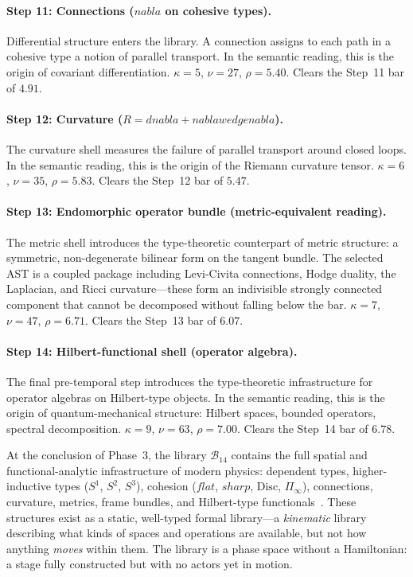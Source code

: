 \documentclass[11pt,a4paper]{article}
\def\nabla{nabla}%
\def\wedge{wedge}%
\def\flat{flat}%
\def\sharp{sharp}%
\theoremstyle{plain}
\theoremstyle{definition}
\theoremstyle{remark}
\newcommand{\Disc}{\mathrm{Disc}}
\newcommand{\B}{\mathcal{B}}
\begin{document}
\paragraph{Step 11: Connections ($\nabla$ on cohesive types).}  Differential structure enters the library.  A connection assigns to each path in a cohesive type a notion of parallel transport.  In the semantic reading, this is the origin of covariant differentiation.  $\kappa = 5$, $\nu = 27$, $\rho = 5.40$.  Clears the Step~11 bar of $4.91$.

\paragraph{Step 12: Curvature ($R = d\nabla + \nabla \wedge \nabla$).}  The curvature shell measures the failure of parallel transport around closed loops.  In the semantic reading, this is the origin of the Riemann curvature tensor.  $\kappa = 6$, $\nu = 35$, $\rho = 5.83$.  Clears the Step~12 bar of $5.47$.

\paragraph{Step 13: Endomorphic operator bundle (metric-equivalent reading).}  The metric shell introduces the type-theoretic counterpart of metric structure: a symmetric, non-degenerate bilinear form on the tangent bundle.  The selected AST is a coupled package including Levi-Civita connections, Hodge duality, the Laplacian, and Ricci curvature---these form an indivisible strongly connected component that cannot be decomposed without falling below the bar.  $\kappa = 7$, $\nu = 47$, $\rho = 6.71$.  Clears the Step~13 bar of $6.07$.

\paragraph{Step 14: Hilbert-functional shell (operator algebra).}  The final pre-temporal step introduces the type-theoretic infrastructure for operator algebras on Hilbert-type objects.  In the semantic reading, this is the origin of quantum-mechanical structure: Hilbert spaces, bounded operators, spectral decomposition.  $\kappa = 9$, $\nu = 63$, $\rho = 7.00$.  Clears the Step~14 bar of $6.78$.

At the conclusion of Phase~3, the library $\B_{14}$ contains the full spatial and functional-analytic infrastructure of modern physics: dependent types, higher-inductive types ($S^1$, $S^2$, $S^3$), cohesion ($\flat$, $\sharp$, $\Disc$, $\Pi_{\!\infty}$), connections, curvature, metrics, frame bundles, and Hilbert-type functionals~\cite{pen2026}.  These structures exist as a static, well-typed formal library---a \emph{kinematic} library describing what kinds of spaces and operations are available, but not how anything \emph{moves} within them.  The library is a phase space without a Hamiltonian: a stage fully constructed but with no actors yet in motion.
\end{document}
